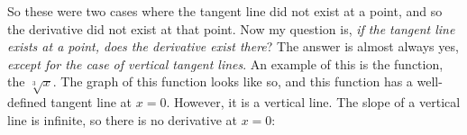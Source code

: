 \documentclass[pdftex, brazil, 12pt, twoside]{article}
\begin{document}
\begin{figure}[H]
  \begin{center}
  \end{center}
\end{figure}

So these were two cases where the tangent line did not
exist at a point, and so the derivative did not
exist at that point.
Now my question is, \emph{if the tangent line exists at a point,
does the derivative exist there}?
The answer is almost always yes, \emph{except for the case
  of vertical tangent lines}.
An example of this is the function, the $\sqrt[3]{x}$.
The graph of this function looks like so,
and this function has a well-defined tangent
line at $x = 0$. However, it is a vertical line.
The slope of a vertical line is infinite,
so there is no derivative at $x = 0$:

\begin{figure}[H]
  \begin{center}
  \end{center}
\end{figure}
\end{document}
